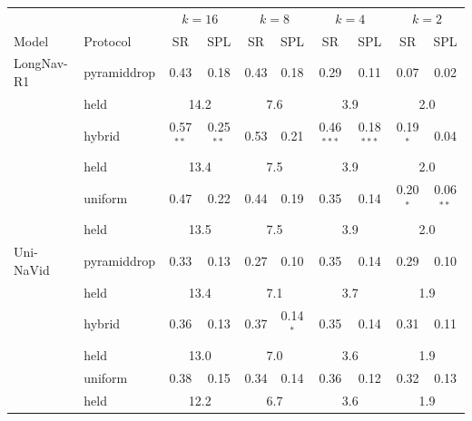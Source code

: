 \begin{tabular}{llcccccccc}
\toprule
 & & \multicolumn{2}{c}{$k=16$} & \multicolumn{2}{c}{$k=8$} & \multicolumn{2}{c}{$k=4$} & \multicolumn{2}{c}{$k=2$} \\
Model & Protocol & SR & SPL & SR & SPL & SR & SPL & SR & SPL \\
\midrule
LongNav-R1 & pyramiddrop & 0.43 & 0.18 & 0.43 & 0.18 & 0.29 & 0.11 & 0.07 & 0.02 \\
 & \quad held & \multicolumn{2}{c}{14.2} & \multicolumn{2}{c}{7.6} & \multicolumn{2}{c}{3.9} & \multicolumn{2}{c}{2.0} \\
 & hybrid & 0.57$^{**}$ & 0.25$^{**}$ & 0.53 & 0.21 & 0.46$^{***}$ & 0.18$^{***}$ & 0.19$^{*}$ & 0.04 \\
 & \quad held & \multicolumn{2}{c}{13.4} & \multicolumn{2}{c}{7.5} & \multicolumn{2}{c}{3.9} & \multicolumn{2}{c}{2.0} \\
 & uniform & 0.47 & 0.22 & 0.44 & 0.19 & 0.35 & 0.14 & 0.20$^{*}$ & 0.06$^{**}$ \\
 & \quad held & \multicolumn{2}{c}{13.5} & \multicolumn{2}{c}{7.5} & \multicolumn{2}{c}{3.9} & \multicolumn{2}{c}{2.0} \\
\midrule
Uni-NaVid & pyramiddrop & 0.33 & 0.13 & 0.27 & 0.10 & 0.35 & 0.14 & 0.29 & 0.10 \\
 & \quad held & \multicolumn{2}{c}{13.4} & \multicolumn{2}{c}{7.1} & \multicolumn{2}{c}{3.7} & \multicolumn{2}{c}{1.9} \\
 & hybrid & 0.36 & 0.13 & 0.37 & 0.14$^{*}$ & 0.35 & 0.14 & 0.31 & 0.11 \\
 & \quad held & \multicolumn{2}{c}{13.0} & \multicolumn{2}{c}{7.0} & \multicolumn{2}{c}{3.6} & \multicolumn{2}{c}{1.9} \\
 & uniform & 0.38 & 0.15 & 0.34 & 0.14 & 0.36 & 0.12 & 0.32 & 0.13 \\
 & \quad held & \multicolumn{2}{c}{12.2} & \multicolumn{2}{c}{6.7} & \multicolumn{2}{c}{3.6} & \multicolumn{2}{c}{1.9} \\
\bottomrule
\end{tabular}
